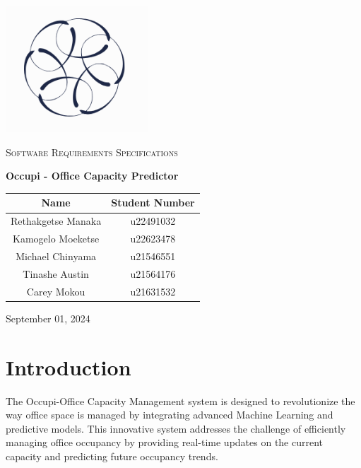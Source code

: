 \documentclass[11pt,a4paper]{article}
\begin{document}
\begin{titlepage}
    \centering
    \includegraphics[width=0.4\textwidth]{logo-white.png}\par\vspace{1cm}
    {\scshape\LARGE Software Requirements Specifications\par}
    \vspace{1.5cm}
    {\huge\bfseries Occupi - Office Capacity Predictor\par}
    \vspace{2.5cm}
    \begin{tabular}{|c|c|}
        \hline
        \textbf{Name}      & \textbf{Student Number} \\
        \hline
        Rethakgetse Manaka & u22491032               \\
        Kamogelo Moeketse  & u22623478               \\
        Michael Chinyama   & u21546551               \\
        Tinashe Austin     & u21564176               \\
        Carey Mokou        & u21631532               \\
        \hline
    \end{tabular}
    \vfill
    {\large September 01, 2024\par}
\end{titlepage}

\tableofcontents
\pagebreak


\section*{Introduction}
The Occupi-Office Capacity Management system is designed to revolutionize the way office space is managed by integrating advanced Machine Learning and predictive models. This innovative system addresses the challenge of efficiently managing office occupancy by providing real-time updates on the current capacity and predicting future occupancy trends.
\end{document}
